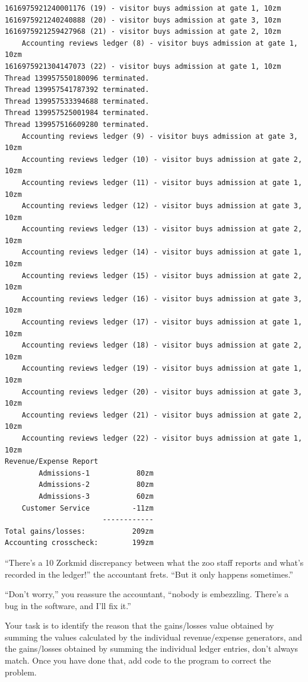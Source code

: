 \begin{verbatim}
1616975921240001176 (19) - visitor buys admission at gate 1, 10zm
1616975921240240888 (20) - visitor buys admission at gate 3, 10zm
1616975921259427968 (21) - visitor buys admission at gate 2, 10zm
	Accounting reviews ledger (8) - visitor buys admission at gate 1, 10zm
1616975921304147073 (22) - visitor buys admission at gate 1, 10zm
Thread 139957550180096 terminated.
Thread 139957541787392 terminated.
Thread 139957533394688 terminated.
Thread 139957525001984 terminated.
Thread 139957516609280 terminated.
	Accounting reviews ledger (9) - visitor buys admission at gate 3, 10zm
	Accounting reviews ledger (10) - visitor buys admission at gate 2, 10zm
	Accounting reviews ledger (11) - visitor buys admission at gate 1, 10zm
	Accounting reviews ledger (12) - visitor buys admission at gate 3, 10zm
	Accounting reviews ledger (13) - visitor buys admission at gate 2, 10zm
	Accounting reviews ledger (14) - visitor buys admission at gate 1, 10zm
	Accounting reviews ledger (15) - visitor buys admission at gate 2, 10zm
	Accounting reviews ledger (16) - visitor buys admission at gate 3, 10zm
	Accounting reviews ledger (17) - visitor buys admission at gate 1, 10zm
	Accounting reviews ledger (18) - visitor buys admission at gate 2, 10zm
	Accounting reviews ledger (19) - visitor buys admission at gate 1, 10zm
	Accounting reviews ledger (20) - visitor buys admission at gate 3, 10zm
	Accounting reviews ledger (21) - visitor buys admission at gate 2, 10zm
	Accounting reviews ledger (22) - visitor buys admission at gate 1, 10zm
Revenue/Expense Report
        Admissions-1           80zm
        Admissions-2           80zm
        Admissions-3           60zm
    Customer Service          -11zm
                       ------------
Total gains/losses:           209zm
Accounting crosscheck:        199zm
\end{verbatim}

``There's a 10 Zorkmid discrepancy between what the zoo staff reports and
what's recorded in the ledger!'' the accountant frets. ``But it only happens
sometimes.''

``Don't worry,'' you reassure the accountant, ``nobody is embezzling. There's a
bug in the software, and I'll fix it.''

Your task is to identify the reason that the gains/losses value obtained by
summing the values calculated by the individual revenue/expense generators, and
the gains/losses obtained by summing the individual ledger entries, don't
always match. Once you have done that, add code to the program to correct the
problem.


